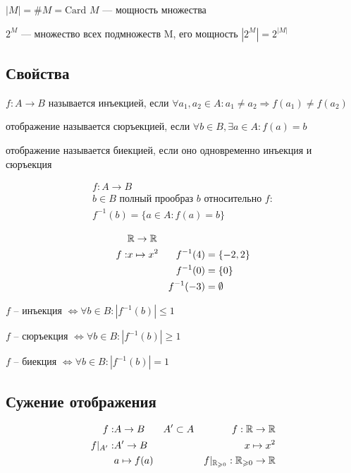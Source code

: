 \documentclass[main]{subfiles}
\begin{document}
$|M| = \#M = \text{Card } M$ --- мощность множества

$2^M$ --- множество всех подмножеств M, его мощность $|2^M| = 2^{|M|}$

\subsection{Свойства}
$f: A \to B$ называется инъекцией, если $\forall a_1, a_2 \in A: a_1 \neq a_2 \Rightarrow f(a_1)\neq f(a_2)$

отображение называется сюръекцией, если $\forall b \in B, \exists a \in A: f(a) = b$

отображение называется биекцией, если оно одновременно инъекция и сюръекция

\begin{gather*}
    f: A \to B\\
    b\in B \text{ полный прообраз } b \text{ относительно } f: \\
    f^{-1}(b) = \{a \in A : f(a) = b\}
\end{gather*}

\begin{align*}
       & \mathbb{R} \to \mathbb{R}     &            &             \\
    f: & x \mapsto x^2 & f^{-1}(4)  & = \{-2,2\}  \\
       &               & f^{-1}(0)  & = \{0\}     \\
       &               & f^{-1}(-3) & = \emptyset \\
\end{align*}

$f$ -- инъекция $\Leftrightarrow \forall b \in B: |f^{-1}(b)| \le 1$

$f$ -- сюръекция $\Leftrightarrow \forall b \in B:|f^{-1}(b)| \ge 1$

$f$ -- биекция $\Leftrightarrow \forall b \in B:|f^{-1}(b)| = 1$

\subsection{Сужение отображения}

\begin{align*}
    f:        & A \to B       &  & A' \subset A & f: \mathbb{R} \to \mathbb{R}                        \\
    f|_{A'} : & A' \to B      &  &              & x \mapsto x^2                       \\
              & a\mapsto f(a) &  &              & f|_{\mathbb{R}_{\geqslant 0}} : \mathbb{R}_{\geqslant 0} \to \mathbb{R}
\end{align*}
\end{document}
